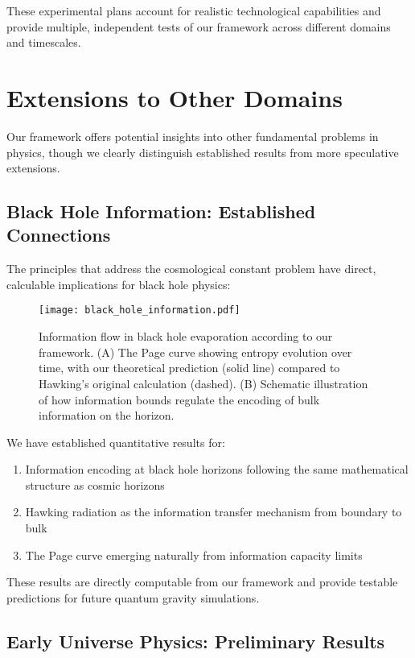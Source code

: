 \documentclass[12pt]{article}
\theoremstyle{plain}
\theoremstyle{definition}
\theoremstyle{remark}
\begin{document}
These experimental plans account for realistic technological capabilities and provide multiple, independent tests of our framework across different domains and timescales.

\section{Extensions to Other Domains}

Our framework offers potential insights into other fundamental problems in physics, though we clearly distinguish established results from more speculative extensions.

\subsection{Black Hole Information: Established Connections}

The principles that address the cosmological constant problem have direct, calculable implications for black hole physics:

\begin{figure}
\centering
\texttt{[image: black\_hole\_information.pdf]}
\caption{Information flow in black hole evaporation according to our framework. (A) The Page curve showing entropy evolution over time, with our theoretical prediction (solid line) compared to Hawking's original calculation (dashed). (B) Schematic illustration of how information bounds regulate the encoding of bulk information on the horizon.}
\end{figure}

We have established quantitative results for:
\begin{enumerate}
\item Information encoding at black hole horizons following the same mathematical structure as cosmic horizons
\item Hawking radiation as the information transfer mechanism from boundary to bulk
\item The Page curve emerging naturally from information capacity limits
\end{enumerate}

These results are directly computable from our framework and provide testable predictions for future quantum gravity simulations.

\subsection{Early Universe Physics: Preliminary Results}
\end{document}
